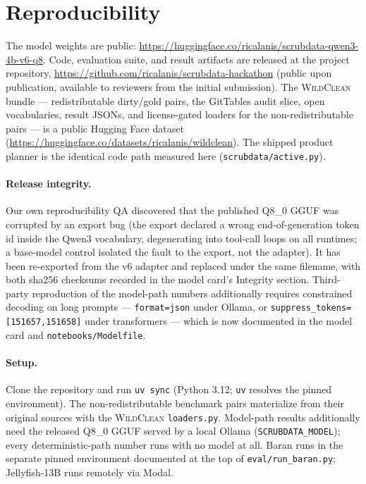 \documentclass[11pt]{article}
\begin{document}
\section*{Reproducibility}
\begin{sloppypar}
The model weights are public:
\url{https://huggingface.co/ricalanis/scrubdata-qwen3-4b-v6-q8}. Code, evaluation
suite, and result artifacts are released at the project repository,
\url{https://github.com/ricalanis/scrubdata-hackathon} (public upon publication,
available to reviewers from the initial submission). The \textsc{WildClean}
bundle --- redistributable dirty/gold pairs, the GitTables audit slice, open
vocabularies, result JSONs, and license-gated loaders for the non-redistributable
pairs --- is a public Hugging Face dataset
(\url{https://huggingface.co/datasets/ricalanis/wildclean}). The shipped product
planner is the identical code path measured here (\texttt{scrubdata/active.py}).
\end{sloppypar}

\paragraph{Release integrity.} Our own reproducibility QA discovered that the
published Q8\_0 GGUF was corrupted by an export bug (the export declared a wrong
end-of-generation token id inside the Qwen3 vocabulary, degenerating into
tool-call loops on all runtimes; a base-model control isolated the fault to the
export, not the adapter). It has been re-exported from the v6 adapter and
replaced under the same filename, with both sha256 checksums recorded in the
model card's Integrity section. Third-party reproduction of the model-path
numbers additionally requires constrained decoding on long prompts ---
\texttt{format=json} under Ollama, or
\texttt{suppress\_tokens=[151657,151658]} under transformers --- which is now
documented in the model card and \texttt{notebooks/Modelfile}.

\paragraph{Setup.} Clone the repository and run \texttt{uv sync} (Python 3.12;
\texttt{uv} resolves the pinned environment). The non-redistributable benchmark
pairs materialize from their original sources with the \textsc{WildClean}
\texttt{loaders.py}. Model-path results additionally need the released Q8\_0 GGUF
served by a local Ollama (\texttt{SCRUBDATA\_MODEL}); every deterministic-path
number runs with no model at all. Baran runs in the separate pinned environment
documented at the top of \texttt{eval/run\_baran.py}; Jellyfish-13B runs remotely
via Modal.
\end{document}
